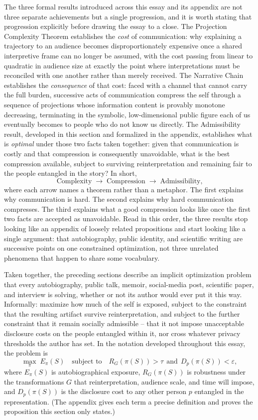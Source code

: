\documentclass[11pt]{article}
\theoremstyle{plain}
\begin{document}
The three formal results introduced across this essay and its appendix are not three separate achievements but a single progression, and it is worth stating that progression explicitly before drawing the essay to a close. The Projection Complexity Theorem establishes the \emph{cost} of communication: why explaining a trajectory to an audience becomes disproportionately expensive once a shared interpretive frame can no longer be assumed, with the cost passing from linear to quadratic in audience size at exactly the point where interpretations must be reconciled with one another rather than merely received. The Narrative Chain establishes the \emph{consequence} of that cost: faced with a channel that cannot carry the full burden, successive acts of communication compress the self through a sequence of projections whose information content is provably monotone decreasing, terminating in the symbolic, low-dimensional public figure each of us eventually becomes to people who do not know us directly. The Admissibility result, developed in this section and formalized in the appendix, establishes what is \emph{optimal} under those two facts taken together: given that communication is costly and that compression is consequently unavoidable, what is the best compression available, subject to surviving reinterpretation and remaining fair to the people entangled in the story? In short,
\[
\text{Complexity} \;\longrightarrow\; \text{Compression} \;\longrightarrow\; \text{Admissibility,}
\]
where each arrow names a theorem rather than a metaphor. The first explains why communication is hard. The second explains why hard communication compresses. The third explains what a good compression looks like once the first two facts are accepted as unavoidable. Read in this order, the three results stop looking like an appendix of loosely related propositions and start looking like a single argument: that autobiography, public identity, and scientific writing are successive points on one constrained optimization, not three unrelated phenomena that happen to share some vocabulary.

Taken together, the preceding sections describe an implicit optimization problem that every autobiography, public talk, memoir, social-media post, scientific paper, and interview is solving, whether or not its author would ever put it this way. Informally: maximize how much of the self is exposed, subject to the constraint that the resulting artifact survive reinterpretation, and subject to the further constraint that it remain socially admissible -- that it not impose unacceptable disclosure costs on the people entangled within it, nor cross whatever privacy thresholds the author has set. In the notation developed throughout this essay, the problem is
\[
\max_{\pi} \; E_\pi(S) \quad \text{subject to} \quad R_G(\pi(S)) > \tau \ \ \text{and} \ \ D_p(\pi(S)) < \varepsilon,

\]
where $E_\pi(S)$ is autobiographical exposure, $R_G(\pi(S))$ is robustness under the transformations $G$ that reinterpretation, audience scale, and time will impose, and $D_p(\pi(S))$ is the disclosure cost to any other person $p$ entangled in the representation. (The appendix gives each term a precise definition and proves the proposition this section only states.)
\end{document}
